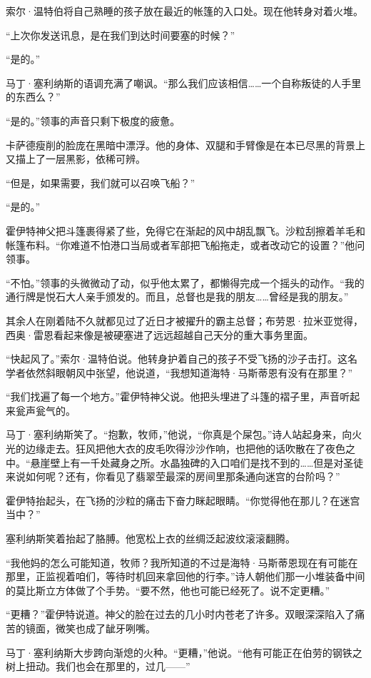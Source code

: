 \documentclass[AutoFakeBold=true]{book}
\begin{document}
索尔·温特伯将自己熟睡的孩子放在最近的帐篷的入口处。现在他转身对着火堆。

``上次你发送讯息，是在我们到达时间要塞的时候？''

``是的。''

马丁·塞利纳斯的语调充满了嘲讽。``那么我们应该相信……一个自称叛徒的人手里的东西么？''

``是的。''领事的声音只剩下极度的疲惫。

卡萨德瘦削的脸庞在黑暗中漂浮。他的身体、双腿和手臂像是在本已尽黑的背景上又描上了一层黑影，依稀可辨。

``但是，如果需要，我们就可以召唤飞船？''

``是的。''

霍伊特神父把斗篷裹得紧了些，免得它在渐起的风中胡乱飘飞。沙粒刮擦着羊毛和帐篷布料。``你难道不怕港口当局或者军部把飞船拖走，或者改动它的设置？''他问领事。

``不怕。''领事的头微微动了动，似乎他太累了，都懒得完成一个摇头的动作。``我的通行牌是悦石大人亲手颁发的。而且，总督也是我的朋友……曾经是我的朋友。''

其余人在刚着陆不久就都见过了近日才被擢升的霸主总督；布劳恩·拉米亚觉得，西奥·雷恩看起来像是被硬塞进了远远超越自己天分的重大事务里面。

``快起风了。''索尔·温特伯说。他转身护着自己的孩子不受飞扬的沙子击打。这名学者依然斜眼朝风中张望，他说道，``我想知道海特·马斯蒂恩有没有在那里？''

``我们找遍了每一个地方。''霍伊特神父说。他把头埋进了斗篷的褶子里，声音听起来瓮声瓮气的。

马丁·塞利纳斯笑了。``抱歉，牧师，''他说，``你真是个屎包。''诗人站起身来，向火光的边缘走去。狂风把他大衣的皮毛吹得沙沙作响，也把他的话吹散在了夜色之中。``悬崖壁上有一千处藏身之所。水晶独碑的入口咱们是找不到的……但是对圣徒来说如何呢？还有，你看见了翡翠茔最深的房间里那条通向迷宫的台阶吗？''

霍伊特抬起头，在飞扬的沙粒的痛击下奋力眯起眼睛。``你觉得他在那儿？在迷宫当中？''

塞利纳斯笑着抬起了胳膊。他宽松上衣的丝绸泛起波纹滚滚翻腾。

``我他妈的怎么可能知道，牧师？我所知道的不过是海特·马斯蒂恩现在有可能在那里，正监视着咱们，等待时机回来拿回他的行李。''诗人朝他们那一小堆装备中间的莫比斯立方体做了个手势。``要不然，他也可能已经死了。说不定更糟。''

``更糟？''霍伊特说道。神父的脸在过去的几小时内苍老了许多。双眼深深陷入了痛苦的镜面，微笑也成了龇牙咧嘴。

马丁·塞利纳斯大步跨向渐熄的火种。``更糟，''他说。``他有可能正在伯劳的钢铁之树上扭动。我们也会在那里的，过几——''
\end{document}
